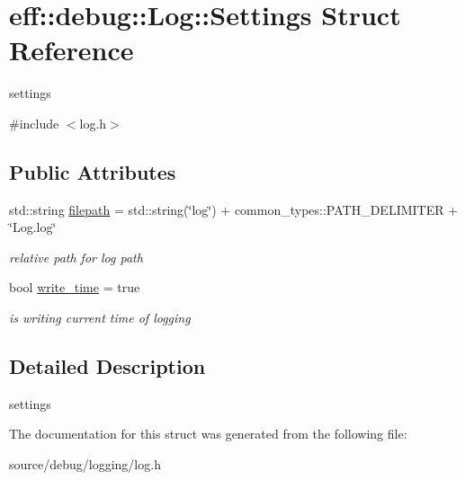\hypertarget{structeff_1_1debug_1_1Log_1_1Settings}{}\section{eff\+:\+:debug\+:\+:Log\+:\+:Settings Struct Reference}
\label{structeff_1_1debug_1_1Log_1_1Settings}


settings  




{\ttfamily \#include $<$log.\+h$>$}

\subsection*{Public Attributes}
\begin{DoxyCompactItemize}
\item 
\mbox{\label{structeff_1_1debug_1_1Log_1_1Settings_aac312f17f99e607e9ce1417dbff702d9}} 
std\+::string \hyperlink{structeff_1_1debug_1_1Log_1_1Settings_aac312f17f99e607e9ce1417dbff702d9}{filepath} = std\+::string(\char`\"{}log\char`\"{}) + common\+\_\+types\+::\+P\+A\+T\+H\+\_\+\+D\+E\+L\+I\+M\+I\+T\+ER + \char`\"{}Log.\+log\char`\"{}
\begin{DoxyCompactList}\small\item\em relative path for log path \end{DoxyCompactList}\item 
\mbox{\label{structeff_1_1debug_1_1Log_1_1Settings_a2a82a51c030cd065aadffabde266779f}} 
bool \hyperlink{structeff_1_1debug_1_1Log_1_1Settings_a2a82a51c030cd065aadffabde266779f}{write\+\_\+time} = true
\begin{DoxyCompactList}\small\item\em is writing current time of logging \end{DoxyCompactList}\end{DoxyCompactItemize}


\subsection{Detailed Description}
settings 

The documentation for this struct was generated from the following file\+:\begin{DoxyCompactItemize}
\item 
source/debug/logging/log.\+h\end{DoxyCompactItemize}
